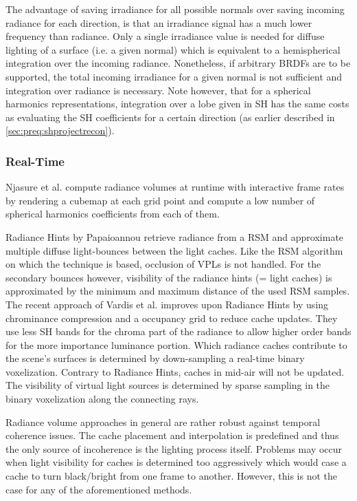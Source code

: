 \documentclass[thesis.tex]{subfiles}
\begin{document}
The advantage of saving irradiance for all possible normals over saving incoming radiance for each direction, is that an irradiance signal has a much lower frequency than radiance.
Only a single irradiance value is needed for diffuse lighting of a surface (i.e. a given normal) which is equivalent to a hemispherical integration over the incoming radiance.
Nonetheless, if arbitrary BRDFs are to be supported, the total incoming irradiance for a given normal is not sufficient and integration over radiance is necessary.
Note however, that for a spherical harmonics representations, integration over a lobe given in SH has the same costs as evaluating the SH coefficients for a certain direction (as earlier described in \autoref{sec:preq:shprojectrecon}).

\subsubsection{Real-Time}
Njasure et al. \cite{bib:nijasure:rtirradiancevol} compute radiance volumes at runtime with interactive frame rates by rendering a cubemap at each grid point and compute a low number of spherical harmonics coefficients from each of them.

Radiance Hints by Papaioannou \cite{bib:radiancehints} retrieve radiance from a RSM and approximate multiple diffuse light-bounces between the light caches.
Like the RSM algorithm on which the technique is based, occlusion of VPLs is not handled.
For the secondary bounces however, visibility of the radiance hints (= light caches) is approximated by the minimum and maximum distance of the used RSM samples.
\\
The recent approach of Vardis et al. \cite{bib:radiancecachechromaticcompression} improves upon Radiance Hints by using chrominance compression and a occupancy grid to reduce cache updates.
They use less SH bands for the chroma part of the radiance to allow higher order bands for the more importance luminance portion.
Which radiance caches contribute to the scene's surfaces is determined by down-sampling a real-time binary voxelization.
Contrary to Radiance Hints, caches in mid-air will not be updated.
The visibility of virtual light sources is determined by sparse sampling in the binary voxelization along the connecting rays.

Radiance volume approaches in general are rather robust against temporal coherence issues.
The cache placement and interpolation is predefined and thus the only source of incoherence is the lighting process itself.
Problems may occur when light visibility for caches is determined too aggressively which would case a cache to turn black/bright from one frame to another.
However, this is not the case for any of the aforementioned methods.
\end{document}
